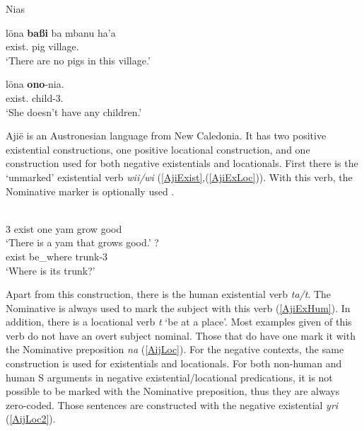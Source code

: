\begin{exe} \ex\label{NiaNegExist} {Nias} \citep[358, 575]{Brown:2001}\nopagebreak[4]
\begin{xlist} \ex \gll l\"ona \textbf{ba{\ss}i} ba mbanu ha'a\\
exist.\Neg{} pig \loc{} village.\mut{} \prox{}\\
\glt `There are no pigs in this village.'

\ex \gll l\"ona \textbf{ono}-nia.\\
exist.\Neg{} child-3\sg{}.\poss{}\\
\glt `She doesn't have any children.'
\end{xlist} 
\end{exe}


Aji\"e is an Austronesian language from New Caledonia. 
It has two positive existential constructions, one positive locational construction, and one construction used for both negative existentials and locationals.
First there is the `unmarked' existential verb \emph{wii/wi} (\ref{AjiExist},(\ref{AjiExLoc})).  
With this verb, the Nominative marker is optionally used \citep[109]{Lichtenberk:1978}.

\begin{exe} \citep[Oceanic; New Caledonia; ][102]{Lichtenberk:1978}\nopagebreak[4]
\begin{xlist}
\ex\label{AjiExist}\gll{}  \textbf{} \textbf{}   \\
3\sg{} exist one yam \relativ{} grow good\\
\glt `There is a yam that grows good.' 
\ex\label{AjiExLoc}\gll{}  \textbf{} \textbf{}?\\
exist be\_where \nom{} trunk-3\sg{}\\
\glt `Where is its trunk?' 
\end{xlist} 
\end{exe}

Apart from this construction, there is the human existential verb \emph{ta/t\textturnv}. 
The Nominative is always used to mark the subject with this verb (\ref{AjiExHum}). 
In addition, there is a locational verb \emph{t\textopeno} `be at a place'.
Most examples given of this verb do not have an overt subject nominal. 
Those that do have one mark it with the Nominative preposition \emph{na} (\ref{AijLoc}). 
For the negative contexts, the same construction is used for existentials and locationals.
For both non-human and human S arguments in negative existential/locational predications, it is not possible to be marked with the Nominative preposition, thus they are always zero-coded.
Those sentences are constructed with the negative existential \emph{y\textepsilon ri} (\ref{AijLoc2}). 

